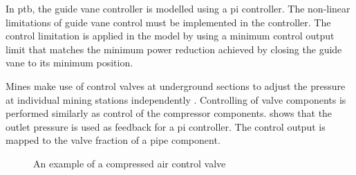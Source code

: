 	
		In \gls{ptb}, the guide vane controller is modelled using a \gls{pi} controller. The non-linear limitations of guide vane control must be implemented in the controller. The control limitation is applied in the model by using a minimum control output limit that matches the minimum power reduction achieved by closing the guide vane to its minimum position. 
		\par 
		Mines make use of control valves at underground sections to adjust the pressure at individual mining stations independently \cite{Heyns2014Masters}. Controlling of valve components is performed similarly as control of the compressor components.  shows that the outlet pressure is used as feedback for a \gls{pi} controller. The control output is mapped to the valve fraction of a pipe component.

		\begin{figure}[h]
			\centering
			\caption[An example of a compressed air control valve]{An example of a compressed air control valve\cite{van2015implementation}} 
			\label{fig: Control}
		\end{figure}
